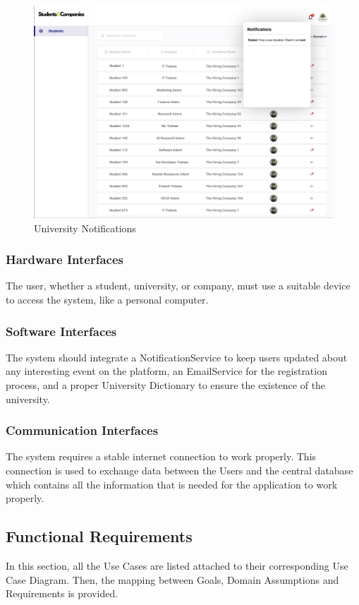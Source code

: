 \documentclass[a4paper,12pt]{article}
\begin{document}
\begin{figure}[H]
    \centering
    \includegraphics[scale = 0.40]{figures/UserInterfaces/University/University Notifications.png}
    \caption{University Notifications}
     \centering
\end{figure}
\subsubsection{Hardware Interfaces}
    The user, whether a student, university, or company, must use a suitable device to access the system, like a personal computer.
\subsubsection{Software Interfaces}
The system should integrate a NotificationService to keep users updated about any interesting event on
the platform, an EmailService for the registration process, and a proper University Dictionary to ensure the existence of the university.
\subsubsection{Communication Interfaces}
    The system requires a stable internet connection to work properly. This connection is used
    to exchange data between the Users and the central database which contains all the information that is needed for the application to work properly.
\subsection{Functional Requirements}
In this section, all the Use Cases are listed attached to their corresponding Use Case Diagram.
Then, the mapping between Goals, Domain Assumptions and Requirements is provided.
\end{document}
